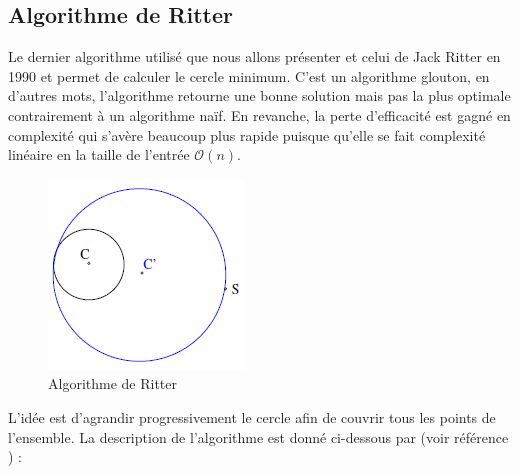 \subsection{Algorithme de Ritter}
Le dernier algorithme utilisé que nous allons présenter et celui de Jack Ritter en 1990 et permet de calculer le cercle minimum. C'est un algorithme glouton, en d'autres mots, l'algorithme retourne une bonne solution mais pas la plus optimale contrairement à un algorithme naïf. En revanche, la perte d'efficacité est gagné en complexité qui s'avère beaucoup plus rapide puisque qu'elle se fait complexité linéaire en la taille de l'entrée $\mathcal{O}(n)$.

\begin{figure}[ht]
\begin{center}
\includegraphics[scale=0.9]{images/ritter.png}
\caption{Algorithme de Ritter}
\end{center}
\end{figure}

L'idée est d'agrandir progressivement le cercle afin de couvrir tous les points de l'ensemble. La description de l'algorithme est donné ci-dessous par  (voir référence \cite{cpa}) :

